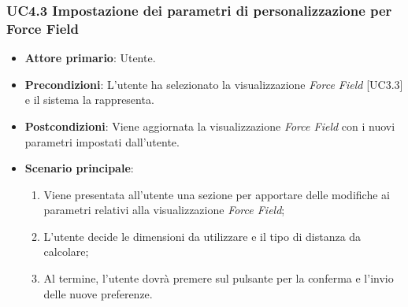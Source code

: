 \subsubsection{UC4.3 Impostazione dei parametri di personalizzazione per Force Field}
\begin{itemize}
	\item \textbf{Attore primario}: Utente.
	\item \textbf{Precondizioni}: L'utente ha selezionato la visualizzazione \textit{Force Field} [UC3.3] e il sistema la rappresenta.
	\item \textbf{Postcondizioni}: Viene aggiornata la visualizzazione \textit{Force Field} con i nuovi parametri impostati dall'utente.
	\item \textbf{Scenario principale}:
	\begin{enumerate}
			\item Viene presentata all'utente una sezione per apportare delle modifiche ai parametri relativi alla visualizzazione \textit{Force Field};
			\item L'utente decide le dimensioni da utilizzare e il tipo di distanza da calcolare;
			\item Al termine, l'utente dovrà premere sul pulsante per la conferma e l'invio delle nuove preferenze.
		\end{enumerate}
\end{itemize}